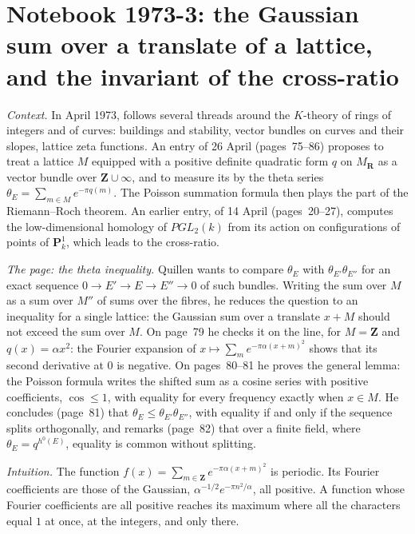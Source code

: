 \section[Notebook 1973-3: Gaussian sums over a translate of a lattice]{Notebook 1973-3: the Gaussian sum over a translate of a lattice, and the invariant of the cross-ratio\protect{}}\label{sec:quillen-1973-3}

\emph{Context.} In April 1973,  follows several threads around the $K$-theory of rings of integers and of curves: buildings and stability, vector bundles on curves and their slopes, lattice zeta functions. An entry of 26 April (pages~75--86) proposes to treat a lattice $M$ equipped with a positive definite quadratic form $q$ on $M_{\mathbf R}$ as a vector bundle over $\mathbf Z \cup \infty$, and to measure its  by the theta series $\theta_E = \sum_{m \in M} e^{-\pi q(m)}$. The Poisson summation formula then plays the part of the Riemann--Roch theorem. An earlier entry, of 14 April (pages~20--27), computes the low-dimensional homology of $PGL_2(k)$ from its action on configurations of points of $\mathbf P^1_k$, which leads to the cross-ratio.

\emph{The page: the theta inequality.} Quillen wants to compare $\theta_E$ with $\theta_{E'}\theta_{E''}$ for an exact sequence $0 \to E' \to E \to E'' \to 0$ of such bundles. Writing the sum over $M$ as a sum over $M''$ of sums over the fibres, he reduces the question to an inequality for a single lattice: the Gaussian sum over a translate $x + M$ should not exceed the sum over $M$. On page~79 he checks it on the line, for $M = \mathbf Z$ and $q(x) = \alpha x^2$: the Fourier expansion of $x \mapsto \sum_m e^{-\pi\alpha(x+m)^2}$ shows that its second derivative at $0$ is negative. On pages~80--81 he proves the general lemma: the Poisson formula writes the shifted sum as a cosine series with positive coefficients, $\cos \le 1$, with equality for every frequency exactly when $x \in M$. He concludes (page~81) that $\theta_E \le \theta_{E'}\theta_{E''}$, with equality if and only if the sequence splits orthogonally, and remarks (page~82) that over a finite field, where $\theta_E = q^{h^0(E)}$, equality is common without splitting.

\emph{Intuition.} The function $f(x) = \sum_{m \in \mathbf Z} e^{-\pi\alpha(x+m)^2}$ is periodic. Its Fourier coefficients are those of the Gaussian, $\alpha^{-1/2} e^{-\pi n^2/\alpha}$, all positive. A function whose Fourier coefficients are all positive reaches its maximum where all the characters equal $1$ at once, at the integers, and only there.

